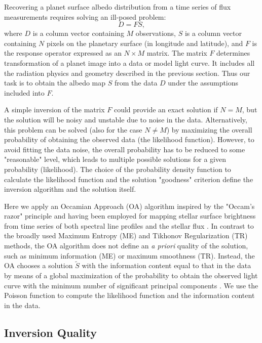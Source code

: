 \documentclass{emulateapj}
\begin{document}
Recovering a planet surface albedo distribution
from a time series of flux measurements
requires solving an ill-posed problem:
\begin{equation}
D=FS,
\end{equation}
where $D$ is a column vector containing $M$ observations,
$S$ is a column vector containing $N$ pixels on the planetary surface (in longitude and latitude), and
$F$ is the response operator expressed as an $N\times M$ matrix.
The matrix $F$ determines transformation of a planet image into a data or model light curve. 
It includes all the radiation physics and geometry described in the previous section.
Thus our task is to obtain the albedo map $S$ from the data $D$ under the assumptions included into $F$.

A simple inversion of the matrix $F$ could provide an exact solution if $N=M$, but the solution
will be noisy and unstable due to noise in the data. Alternatively, this problem can be solved 
(also for the case $N\ne M$)
by maximizing the overall probability of obtaining the observed data 
(the likelihood function). However, to avoid fitting the data noise, the overall probability
has to be reduced to some "reasonable" level, which leads to multiple possible solutions
for a given probability (likelihood). The choice of the probability density function
to calculate the likelihood function and the solution "goodness" criterion define the inversion
algorithm and the solution itself.

Here we apply an Occamian Approach (OA) algorithm inspired by the "Occam's razor" principle
and having been employed for mapping stellar surface brightness 
from time series of both spectral line profiles and the stellar flux 
\citep[e.g.,][]{berdetal1998,berdetal2002}. In contrast to the broadly used Maximum Entropy (ME) 
and Tikhonov Regularization (TR) methods, the OA algorithm does not define 
an {\it a priori} quality of the solution, such as minimum information (ME) or maximum smoothness
(TR). Instead, the OA chooses a solution $\tilde{S}$ with the information content equal to that
in the data by means of a global maximization of the probability 
to obtain the observed light curve with the minimum number of significant 
principal components \citep[see details in][]{berd1998}. We use the Poisson function 
to compute the likelihood function and the information content in the data. 


\subsection{Inversion Quality}\label{sec:iq}
\end{document}
